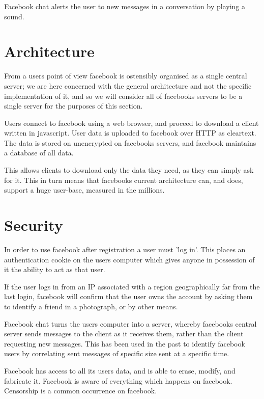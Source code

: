 Facebook chat alerts the user to new messages in a conversation by playing a
sound.

\section{Architecture}
From a users point of view facebook is ostensibly organised as a single central
server; we are here concerned with the general architecture and not the
specific implementation of it, and so we will consider all of facebooks servers
to be a single server for the purposes of this section.

Users connect to facebook using a web browser, and proceed to download a client
written in javascript. User data is uploaded to facebook over HTTP as cleartext.
The data is stored on unencrypted on facebooks servers, and facebook maintains
a database of all data.

This allows clients to download only the data they need, as they can simply ask
for it. This in turn means that facebooks current architecture can, and does,
support a huge user-base, measured in the millions.


\section{Security}
In order to use facebook after registration a user must 'log in'. This places an
authentication cookie on the users computer which gives anyone in possession of
it the ability to act as that user.

If the user logs in from an IP associated with a region geographically far from
the last login, facebook will confirm that the user owns the account by asking
them to identify a friend in a photograph, or by other means.

Facebook chat turns the users computer into a server, whereby facebooks central
server sends messages to the client as it receives them, rather than the client
requesting new messages. This has been used in the past to identify facebook
users by correlating sent messages of specific size sent at a specific time.

Facebook has access to all its users data, and is able to erase, modify, and
fabricate it. Facebook is aware of everything which happens on facebook.
Censorship is a common occurrence on facebook.
